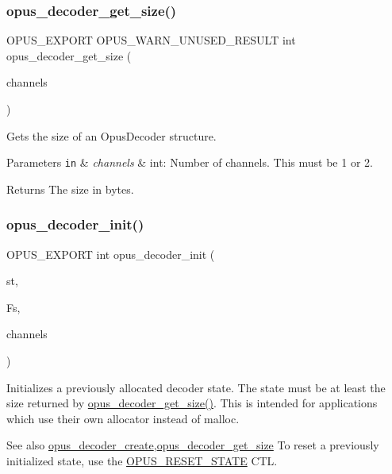 \subsubsection{\texorpdfstring{opus\+\_\+decoder\+\_\+get\+\_\+size()}{opus\_decoder\_get\_size()}}
{\footnotesize\ttfamily O\+P\+U\+S\+\_\+\+E\+X\+P\+O\+RT O\+P\+U\+S\+\_\+\+W\+A\+R\+N\+\_\+\+U\+N\+U\+S\+E\+D\+\_\+\+R\+E\+S\+U\+LT int opus\+\_\+decoder\+\_\+get\+\_\+size (\begin{DoxyParamCaption}\item[{int}]{channels }\end{DoxyParamCaption})}

Gets the size of an {\ttfamily Opus\+Decoder} structure. 
\begin{DoxyParams}[1]{Parameters}
\mbox{\tt in}  & {\em channels} & {\ttfamily int}\+: Number of channels. This must be 1 or 2. \\
\hline
\end{DoxyParams}
\begin{DoxyReturn}{Returns}
The size in bytes. 
\end{DoxyReturn}
\mbox{\label{group__opus__decoder_ga40746b48a7b1653987a3a6db2ce3a40b}} 
\subsubsection{\texorpdfstring{opus\+\_\+decoder\+\_\+init()}{opus\_decoder\_init()}}
{\footnotesize\ttfamily O\+P\+U\+S\+\_\+\+E\+X\+P\+O\+RT int opus\+\_\+decoder\+\_\+init (\begin{DoxyParamCaption}\item[{\hyperlink{group__opus__decoder_ga401d8579958d36094715a6b90cd159a6}{Opus\+Decoder} $\ast$}]{st,  }\item[{\hyperlink{opus__types_8h_aa4d309d6f80b99dbabebc8f98879ab9a}{opus\+\_\+int32}}]{Fs,  }\item[{int}]{channels }\end{DoxyParamCaption})}

Initializes a previously allocated decoder state. The state must be at least the size returned by \hyperlink{group__opus__decoder_gaee52cd75f7160fda7a0916d72363940b}{opus\+\_\+decoder\+\_\+get\+\_\+size()}. This is intended for applications which use their own allocator instead of malloc. \begin{DoxySeeAlso}{See also}
\hyperlink{group__opus__decoder_ga6a06f16309dee5883c27223d127c4300}{opus\+\_\+decoder\+\_\+create},\hyperlink{group__opus__decoder_gaee52cd75f7160fda7a0916d72363940b}{opus\+\_\+decoder\+\_\+get\+\_\+size} To reset a previously initialized state, use the \hyperlink{group__opus__genericctls_gadc74e4fa8bcdf9994187d52d92207337}{O\+P\+U\+S\+\_\+\+R\+E\+S\+E\+T\+\_\+\+S\+T\+A\+TE} C\+TL. 
\end{DoxySeeAlso}

